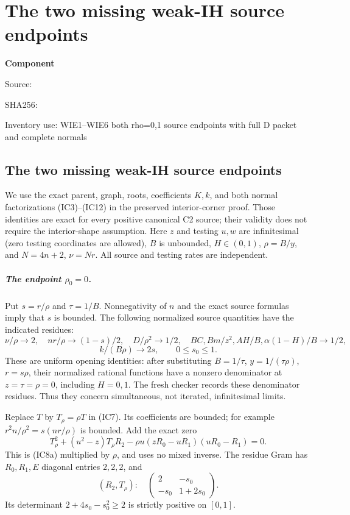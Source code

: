 \chapter{The two missing weak-IH source endpoints}
\label{component:p18dbedfff317}
\noindent\textbf{Component }\par
{\small\noindent Source: \par}
{\small\noindent SHA256: \par}
{\small\noindent Inventory use: WIE1--WIE6 both rho=0,1 source endpoints with full D packet and complete normals\par}
\medskip
\section{The two missing weak-IH source endpoints}
\label{p18dbedfff317:sec:weak-ih-endpoints}
We use the exact parent, graph, roots, coefficients $K,k$, and both
normal factorizations (IC3)--(IC12) in the preserved interior-corner
proof.  Those identities are exact for every positive canonical C2
source; their validity does not require the interior-shape assumption.
Here $z$ and testing $u,w$ are infinitesimal (zero testing coordinates
are allowed), $B$ is unbounded, $H\in(0,1)$, $\rho=B/y$, and
$N=4n+2$, $\nu=Nr$. All source and testing rates are independent.

\paragraph{The endpoint $\rho_0=0$.}
Put $s=r/\rho$ and $\tau=1/B$. Nonnegativity of $n$ and the exact
source formulas imply that $s$ is bounded. The following normalized
source quantities have the indicated residues:
\[
 \nu/\rho\to2,\quad nr/\rho\to(1-s)/2,\quad
 D/\rho^2\to1/2,\quad BC,Bm/z^2,AH/B,\alpha(1-H)/B\to1/2,
\]
\[
 k/(B\rho)\to2s,\qquad 0\le s_0\le1.
\tag{WIE1}
\]
These are uniform opening identities: after substituting
$B=1/\tau$, $y=1/(\tau\rho)$, $r=s\rho$, their normalized rational
functions have a nonzero denominator at $z=\tau=\rho=0$, including
$H=0,1$. The fresh checker records these denominator residues.
Thus they concern simultaneous, not iterated, infinitesimal limits.

Replace $T$ by $T_\rho=\rho T$ in (IC7). Its coefficients are bounded;
for example $r^2n/\rho^2=s(nr/\rho)$ is bounded. Add the exact zero
\[
 T_\rho^2+(u^2-z)T_\rho R_2
 -\rho u(zR_0-uR_1)(uR_0-R_1)=0.
\tag{WIE2}
\]
This is (IC8a) multiplied by $\rho$, and uses no mixed inverse.
The residue Gram has $R_0,R_1,E$ diagonal entries $2,2,2$, and
\[
 (R_2,T_\rho):\quad
 \begin{pmatrix}2&-s_0\\-s_0&1+2s_0\end{pmatrix}.
\]
Its determinant $2+4s_0-s_0^2\ge2$ is strictly positive on $[0,1]$.

